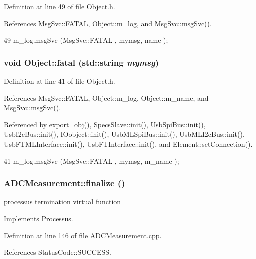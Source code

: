 Definition at line 49 of file Object.h.

References MsgSvc::FATAL, Object::m\_\-log, and MsgSvc::msgSvc().


\begin{DoxyCode}
49 { m_log.msgSvc (MsgSvc::FATAL   , mymsg, name ); }
\end{DoxyCode}
\hypertarget{classObject_aad5a16aac7516ce65bd5ec02ab07fc80}{
\subsubsection[{fatal}]{\setlength{\rightskip}{0pt plus 5cm}void Object::fatal (std::string {\em mymsg})}}
\label{classObject_aad5a16aac7516ce65bd5ec02ab07fc80}


Definition at line 41 of file Object.h.

References MsgSvc::FATAL, Object::m\_\-log, Object::m\_\-name, and MsgSvc::msgSvc().

Referenced by export\_\-obj(), SpecsSlave::init(), UsbSpiBus::init(), UsbI2cBus::init(), IOobject::init(), UsbMLSpiBus::init(), UsbMLI2cBus::init(), UsbFTMLInterface::init(), UsbFTInterface::init(), and Element::setConnection().


\begin{DoxyCode}
41 { m_log.msgSvc (MsgSvc::FATAL   , mymsg, m_name ); }
\end{DoxyCode}
\hypertarget{classADCMeasurement_a02a5ae7c0f9c90d0dad00c1d40a1c52a}{
\subsubsection[{finalize}]{ ADCMeasurement::finalize ()}}
\label{classADCMeasurement_a02a5ae7c0f9c90d0dad00c1d40a1c52a}
processus termination virtual function 

Implements \hyperlink{classProcessus_aba93d691f031bdb18ae4b8afb1b2e856}{Processus}.

Definition at line 146 of file ADCMeasurement.cpp.

References StatusCode::SUCCESS.


